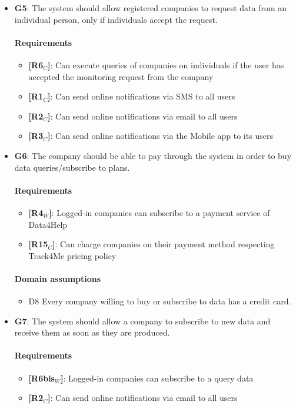 \begin{itemize}
    \item \textbf{G5}: The system should allow registered companies to request data from an individual person, only if individuals accept the request.
    \paragraph{Requirements}
   \begin{itemize}
      \item \textbf{[R6$_C$]}: Can execute queries of companies on individuals if the user has accepted the monitoring request from the company
      \item \textbf{[R1$_C$]}: Can send online notifications via SMS to all users 
    \item \textbf{[R2$_C$]}: Can send online notifications via email to all users
    \item \textbf{[R3$_C$]}: Can send online notifications via the Mobile app to its users
   \end{itemize}
    
    \item \textbf{G6}: The company should be able to pay through the system in order to buy data queries/subscribe to plans.
    \paragraph{Requirements}
   \begin{itemize}
       \item \textbf{[R4$_W$]}: Logged-in companies can subscribe to a payment service of Data4Help
       \item \textbf{[R15$_C$]}: Can charge companies on their payment method respecting Track4Me pricing policy
   \end{itemize}
   \paragraph{Domain assumptions}
   \begin{itemize}
       \item  D8  Every company willing to buy or subscribe to data has a credit card.
   \end{itemize}
   
    \item \textbf{G7}: The system should allow a company to subscribe to new data and receive them as soon as they are produced.
    \paragraph{Requirements}
   \begin{itemize}
       \item \textbf{[R6bis$_W$]}: Logged-in companies can subscribe to a query data
       \item \textbf{[R2$_C$]}: Can send online notifications via email to all users
   \end{itemize}

\end{itemize}
